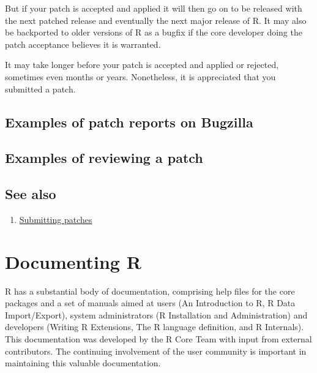 \documentclass[
]{book}
\providecommand{\tightlist}{%
  \setlength{\itemsep}{0pt}\setlength{\parskip}{0pt}}
\begin{document}
But if your patch is accepted and applied it will then go on to be released with the next patched release and eventually the next major release of R. It may also be backported to older versions of R as a bugfix if the core developer doing the patch acceptance believes it is warranted.

It may take longer before your patch is accepted and applied or rejected, sometimes even months or years. Nonetheless, it is appreciated that you submitted a patch.

\hypertarget{examples-of-patch-reports-on-bugzilla}{%
\section{Examples of patch reports on Bugzilla}\label{examples-of-patch-reports-on-bugzilla}}

\hypertarget{examples-of-reviewing-a-patch}{%
\section{Examples of reviewing a patch}\label{examples-of-reviewing-a-patch}}

\hypertarget{see-also-4}{%
\section{See also}\label{see-also-4}}

\begin{enumerate}
\def\labelenumi{\arabic{enumi}.}
\tightlist
\item
  \href{https://www.r-project.org/bugs.html\#how-to-submit-patches}{Submitting patches}
\end{enumerate}

\hypertarget{Doc}{%
\chapter{Documenting R}\label{Doc}}

R has a substantial body of documentation, comprising help files for the core packages and a set of manuals aimed at users (An Introduction to R, R Data Import/Export), system administrators (R Installation and Administration) and developers (Writing R Extensions, The R language definition, and R Internals). This documentation was developed by the R Core Team with input from external contributors. The continuing involvement of the user community is important in maintaining this valuable documentation.
\end{document}
